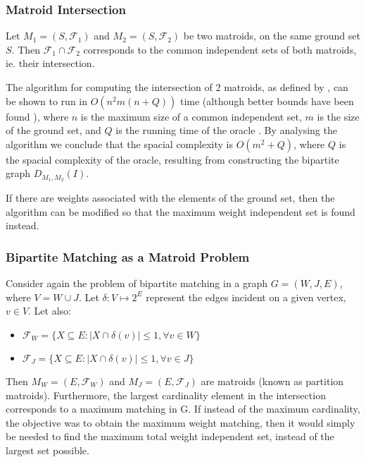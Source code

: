 \documentclass[a4,11pt]{article}
\begin{document}
\subsubsection{Matroid Intersection}
Let $M_1 = (S, \mathcal{F}_1)$ and $M_2 = (S, \mathcal{F}_2)$ be two matroids, on the same ground set $S$.
Then $\mathcal{F}_1 \cap \mathcal{F}_2$ corresponds to the common independent sets of both matroids, ie. their intersection.

The algorithm for computing the intersection of 2 matroids, as defined by \textcite{schrijver_combinatorial_2013}, can be shown to run in $O(n^2 m (n + Q))$ time (although better bounds have been found \cite{schrijver_combinatorial_2013}), where $n$ is the maximum size of a common independent set, $m$ is the size of the ground set, and $Q$ is the running time of the oracle \cite{schrijver_combinatorial_2013}. By analysing the algorithm we conclude that the spacial complexity is $O(m^2 + Q)$, where $Q$ is the spacial complexity of the oracle, resulting from constructing the bipartite graph $D_{M_1, M_2}(I)$.

If there are weights associated with the elements of the ground set, then the algorithm can be modified so that the maximum weight independent set is found instead.

\subsubsection{Bipartite Matching as a Matroid Problem}
Consider again the problem of bipartite matching in a graph $G = (W, J, E)$, where $V = W \cup J$.
Let $\delta : V \mapsto 2^E$ represent the edges incident on a given vertex, $v \in V$. Let also:

\begin{itemize}
    \setlength\itemsep{-.1em}
    \item $\mathcal{F}_W = \{X \subseteq E: |X \cap \delta(v)| \le 1, \forall v \in W\}$
    \item $\mathcal{F}_J = \{X \subseteq E: |X \cap \delta(v)| \le 1, \forall v \in J\}$
\end{itemize}

Then $M_W = (E, \mathcal{F}_W)$ and $M_J = (E, \mathcal{F}_J)$ are matroids \cite{goemans_handout_2011} (known as partition matroids). Furthermore, the largest cardinality element in the intersection corresponds to a maximum matching in G. If instead of the maximum cardinality, the objective was to obtain the maximum weight matching, then it would simply be needed to find the maximum total weight independent set, instead of the largest set possible.
\end{document}
